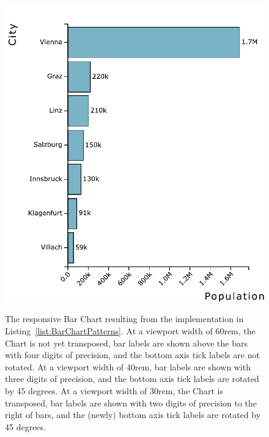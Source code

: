 \begin{figure}[tp]
{  \includegraphics[valign=b,scale=\respscale]{diagrams/respvis-bar-30rem.pdf}%
  \label{fig:BarChartPatterns30rem}%
}
\caption[Responsive RespVis Bar Chart]{%
The responsive Bar Chart resulting from the implementation in
Listing~\ref{list:BarChartPatterns}.
 At a viewport width of 60rem, the
Chart is not yet transposed, bar labels are shown above the bars with
four digits of precision, and the bottom axis tick labels are not
rotated.  At a viewport width of
40rem, bar labels are shown with three digits of precision, and the
bottom axis tick labels are rotated by 45 degrees.
 At a viewport width of 30rem, the
Chart is transposed, bar labels are shown with two digits of precision
to the right of bars, and the (newly) bottom axis tick labels are
rotated by 45 degrees.
}
\label{fig:BarChartPatterns}
\end{figure}









